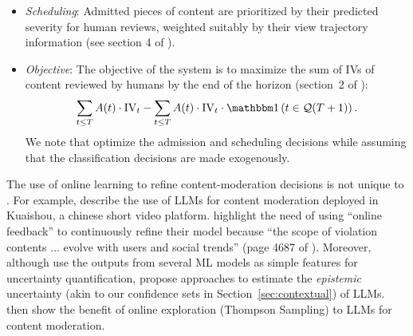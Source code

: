 \begin{itemize}
The key innovation of \cite{Avadhanula2022} is to update the parameters $\{\bar{\beta}_{i,j}\}_{i \leq m, j \leq b}$ in an online manner with labels provided by human reviewers. Specifically, \cite{Avadhanula2022} maintain a dataset $\{\bolds{x}_{\tau}, y_{\tau}\}_{\tau \in \set{D}(t)}$ where $\set{D}(t)$ is the set of reviewed content by time $t$ and $y_{\tau}$ is the severity of content $\tau$. They estimate $\bar{\beta}_{i,j}$ separately. Specifically,  for every pair of $i \leq m,j \leq b$, they fit a one-dimensional linear regression such that  $y_{\tau} \approx (\indic{x_{\tau,i} \in \set{B}_j}x_{\tau,i}) \cdot \beta_{i,j}$ for $\tau \in \set{D}(t).$ The parameters $\{\bar{\beta}_{i,j}\}_{i \leq m, j \leq b}$ are upper-confidence-bound estimates for the linear regression parameters $\{\beta_{i,j}\}_{i \leq m, j \leq b}$.  These parameters are updated ``\emph{once every 5 minutes}'' to adapt to changing violation trends (page 5 in \cite{Avadhanula2022}).
\item \emph{Scheduling}: Admitted pieces of content are prioritized by their predicted severity for human reviews, weighted suitably by their view trajectory information (see section 4 of \cite{Avadhanula2022}).
\item \emph{Objective}: The objective of the system is to maximize the sum of IVs of content reviewed by humans by the end of the horizon (section~2 of \cite{Avadhanula2022}):
\begin{equation}\label{eq:obj-pipeline}
\sum_{t \leq T} A(t) \cdot \text{IV}_t - \sum_{t \leq T} A(t) \cdot \text{IV}_t \cdot \indic{t \in \set{Q}(T+1)}.
\end{equation}
We note that \cite{Avadhanula2022} optimize the admission and scheduling decisions while assuming that the classification decisions are made exogenously.
\end{itemize}

\begin{remark}The use of online learning to refine content-moderation decisions is not unique to \cite{Avadhanula2022}. For example, \cite{lu2025} describe the use of LLMs for content moderation deployed in Kuaishou, a chinese short video platform. \cite{lu2025} highlight the need of using ``online feedback'' to continuously refine their model because ``the scope of violation contents ... evolve with users and social trends'' (page 4687 of \cite{lu2025}). Moreover, although \cite{Avadhanula2022} use the outputs from several ML models as simple features for  uncertainty quantification, \cite{felicioniimportance} propose approaches to estimate the \emph{epistemic} uncertainty (akin to our confidence sets in Section~\ref{sec:contextual}) of LLMs. \cite{felicioniimportance} then show the benefit of online exploration (Thompson Sampling) to LLMs for content moderation.
\end{remark}


